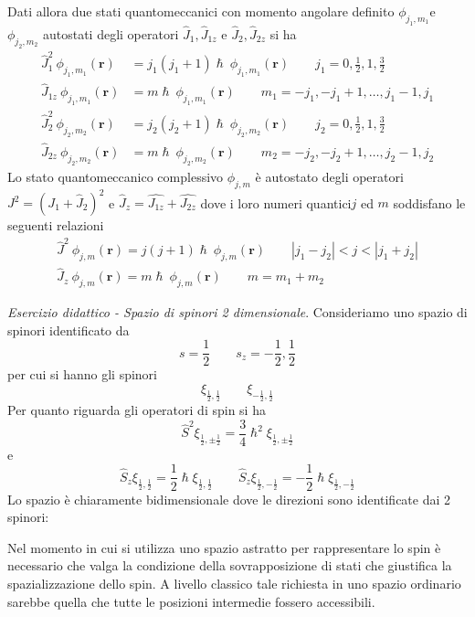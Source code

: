 Dati allora due stati quantomeccanici con momento angolare definito
\(\phi_{j_{1},m_{1}}\)e \(\phi_{j_{2},m_{2}}\) autostati degli operatori
\(\hat{J}_{1},\hat{J}_{1z}\) e \(\hat{J}_{2}, \hat{J}_{2z}\) si ha
\begin{align*}
	\hat{J}_{1}^{2} \ \phi_{j_{1},m_{1}}(\bm{r}) &= j_{1}(j_{1}+1) \hslash \ \phi_{j_{1},m_{1}}(\bm{r}) \qquad j_{1} = 0, \frac{1}{2}, 1, \frac{3}{2}\\
	\hat{J}_{1z} \ \phi_{j_{1},m_{1}}(\bm{r}) &= m \hslash \ \phi_{j_{1},m_{1}}(\bm{r})  \qquad m_{1} = -j_{1} , -j_{1} +1, \dots , j_{1}-1, j_{1}\\
	\hat{J}_{2}^{2} \ \phi_{j_{2},m_{2}}(\bm{r}) &= j_{2}(j_{2}+1) \hslash \ \phi_{j_{2},m_{2}}(\bm{r}) \qquad j_{2} = 0, \frac{1}{2}, 1, \frac{3}{2}\\
	\hat{J}_{2z} \ \phi_{j_{2},m_{2}}(\bm{r}) &= m \hslash \ \phi_{j_{2},m_{2}}(\bm{r})  \qquad m_{2} = -j_{2} , -j_{2} +1, \dots , j_{2}-1, j_{2}
\end{align*}
Lo stato quantomeccanico complessivo \(\phi_{j,m}\) è autostato degli
operatori \(J^{2} = (J_{1} + \hat{J}_{2})^{2}\) e
\(\hat{J}_{z} = \hat{J_{1z}} + \hat{J_{2z}}\) dove i loro numeri
quantici\(j\) ed \(m\) soddisfano le seguenti relazioni \begin{gather*}
	\hat{J}^{2} \ \phi_{j,m}(\bm{r}) = j(j+1) \hslash \ \phi_{j,m}(\bm{r}) \qquad | j_{1} - j_{2}|<j<|j_{1}+j_{2}|\\
	\hat{J}_{z} \ \phi_{j,m}(\bm{r}) = m \hslash \ \phi_{j,m}(\bm{r})  \qquad m = m_{1}+m_{2}
\end{gather*}

\emph{Esercizio didattico - Spazio di spinori 2 dimensionale}.
Consideriamo uno spazio di spinori identificato da \[
	s = \frac{1}{2} \qquad s_{z} = - \frac{1}{2} , \frac{1}{2}
\] per cui si hanno gli spinori \[
	\xi_{\frac{1}{2}, \frac{1}{2}} \qquad \xi_{- \frac{1}{2}, \frac{1}{2}}
\] Per quanto riguarda gli operatori di spin si ha \[
	\hat{S}^{2} \xi_{\frac{1}{2}, \pm \frac{1}{2}} = \frac{3}{4} \hslash^{2} \xi_{\frac{1}{2}, \pm \frac{1}{2}}
\] e \[
	\hat{S}_{z} \xi_{\frac{1}{2}, \frac{1}{2}} = \frac{1}{2} \hslash \xi_{\frac{1}{2}, \frac{1}{2}} \qquad
	\hat{S}_{z} \xi_{\frac{1}{2}, - \frac{1}{2}} = - \frac{1}{2} \hslash \xi_{\frac{1}{2}, -\frac{1}{2}}
\] Lo spazio è chiaramente bidimensionale dove le direzioni sono
identificate dai 2 spinori:

Nel momento in cui si utilizza uno spazio astratto per rappresentare lo
spin è necessario che valga la condizione della sovrapposizione di stati
che giustifica la spazializzazione dello spin.
A livello classico tale
richiesta in uno spazio ordinario sarebbe quella che tutte le posizioni
intermedie fossero accessibili.

